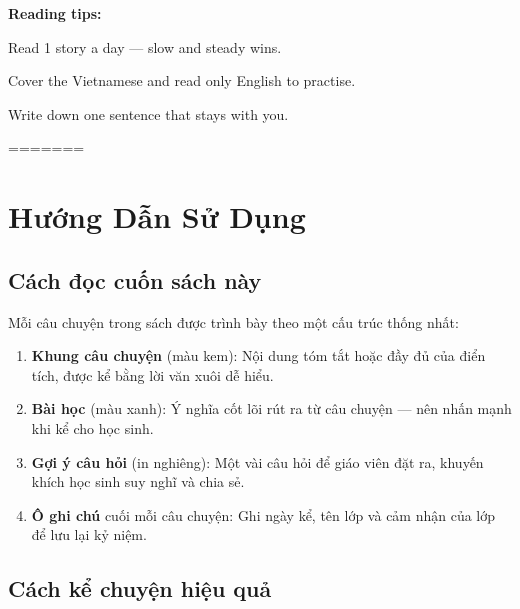 \vspace{4pt}

\begin{ghinhoanh}
\textbf{Reading tips:}

Read 1 story a day --- slow and steady wins.

Cover the Vietnamese and read only English to practise.

Write down one sentence that stays with you.
\end{ghinhoanh}
=======
\chapter*{Hướng Dẫn Sử Dụng}

\section*{Cách đọc cuốn sách này}

Mỗi câu chuyện trong sách được trình bày theo một cấu trúc thống nhất:

\begin{enumerate}[leftmargin=2cm, label=\textcolor{truyenred}{\textbf{\arabic*.}}]
  \item \textbf{Khung câu chuyện} (màu kem): Nội dung tóm tắt hoặc đầy đủ của
        điển tích, được kể bằng lời văn xuôi dễ hiểu.
  \item \textbf{Bài học} (màu xanh): Ý nghĩa cốt lõi rút ra từ câu chuyện ---
        nên nhấn mạnh khi kể cho học sinh.
  \item \textbf{Gợi ý câu hỏi} (in nghiêng): Một vài câu hỏi để giáo viên đặt ra,
        khuyến khích học sinh suy nghĩ và chia sẻ.
  \item \textbf{Ô ghi chú} cuối mỗi câu chuyện: Ghi ngày kể, tên lớp và
        cảm nhận của lớp để lưu lại kỷ niệm.
\end{enumerate}

\section*{Cách kể chuyện hiệu quả}

